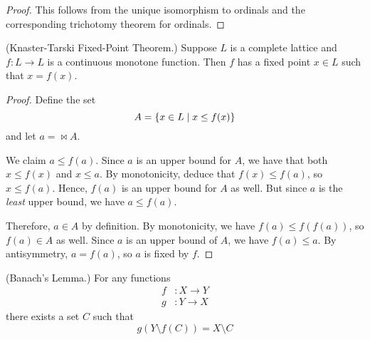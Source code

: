 \documentclass[11pt]{article}
\begin{document}
\begin{proof}
    This follows from the unique isomorphism to ordinals and the corresponding
    trichotomy theorem for ordinals.
\end{proof}

\begin{prop}{(Knaster-Tarski Fixed-Point Theorem.)}
    Suppose $L$ is a complete lattice and $f : L \to L$ is a continuous
    monotone function.
    Then $f$ has a fixed point $x \in L$ such that $x = f(x)$.
\end{prop}

\begin{proof}
    Define the set
    \begin{equation*}
        A = \left\{x \in L \;\vert\; x \leq f(x)\right\}
    \end{equation*}
    and let $a = \Join A$.

    We claim $a \leq f(a)$.
    Since $a$ is an upper bound for $A$,
    we have that both $x \leq f(x)$ and $x \leq a$.
    By monotonicity, deduce that $f(x) \leq f(a)$, so $x \leq f(a)$.
    Hence, $f(a)$ is an upper bound for $A$ as well.
    But since $a$ is the \emph{least} upper bound, we have $a \leq f(a)$.

    Therefore, $a \in A$ by definition.
    By monotonicity, we have $f(a) \leq f(f(a))$,
    so $f(a) \in A$ as well.
    Since $a$ is an upper bound of $A$, we have $f(a) \leq a$.
    By antisymmetry, $a = f(a)$, so $a$ is fixed by $f$.
\end{proof}

\begin{prop}{(Banach's Lemma.)}
    For any functions
    \begin{align*}
        f &: X \to Y \\
        g &: Y \to X
    \end{align*}
    there exists a set $C$ such that
    \begin{equation*}
        g(Y \setminus f(C)) = X \setminus C
    \end{equation*}
\end{prop}
\end{document}
